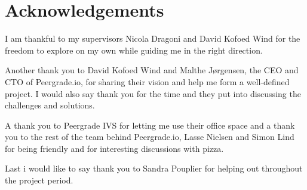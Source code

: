 \chapter{Acknowledgements}

I am thankful to my supervisors Nicola Dragoni and David Kofoed Wind for the freedom to explore on my own while guiding me in the right direction.

Another thank you to David Kofoed Wind and Malthe Jørgensen, the CEO and CTO of Peergrade.io, for sharing their vision and help me form a well-defined project. I would also say thank you for the time and they put into discussing the challenges and solutions.

A thank you to Peergrade IVS for letting me use their office space and a thank you to the rest of the team behind Peergrade.io, Lasse Nielsen and Simon Lind for being friendly and for interesting discussions with pizza.

Last i would like to say thank you to Sandra Pouplier for helping out throughout the project period.
